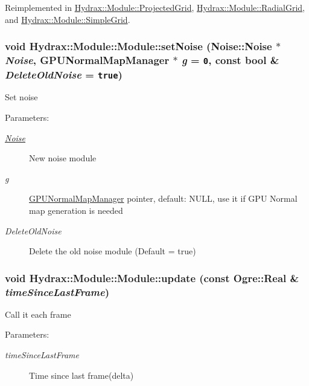 Reimplemented in \hyperlink{class_hydrax_1_1_module_1_1_projected_grid_4502387739439e0d6cca1f006fc4a28c}{Hydrax::Module::ProjectedGrid}, \hyperlink{class_hydrax_1_1_module_1_1_radial_grid_241237552e8f36f7e4696b8bad7acc91}{Hydrax::Module::RadialGrid}, and \hyperlink{class_hydrax_1_1_module_1_1_simple_grid_f79cb3a457da1fe8b015d9d7b5a6a376}{Hydrax::Module::SimpleGrid}.\hypertarget{class_hydrax_1_1_module_1_1_module_f591ded25b7cbba848ec2853402fa91e}{
\subsubsection[{setNoise}]{\setlength{\rightskip}{0pt plus 5cm}void Hydrax::Module::Module::setNoise ({\bf Noise::Noise} $\ast$ {\em Noise}, \/  {\bf GPUNormalMapManager} $\ast$ {\em g} = {\tt 0}, \/  const bool \& {\em DeleteOldNoise} = {\tt true})}}
\label{class_hydrax_1_1_module_1_1_module_f591ded25b7cbba848ec2853402fa91e}


Set noise \begin{Desc}
\item[Parameters:]
\begin{description}
\item[{\em \hyperlink{namespace_hydrax_1_1_noise}{Noise}}]New noise module \item[{\em g}]\hyperlink{class_hydrax_1_1_g_p_u_normal_map_manager}{GPUNormalMapManager} pointer, default: NULL, use it if GPU Normal map generation is needed \item[{\em DeleteOldNoise}]Delete the old noise module (Default = true) \end{description}
\end{Desc}
\hypertarget{class_hydrax_1_1_module_1_1_module_2042d450f99d9348fa4b7bd29ba89df3}{
\subsubsection[{update}]{\setlength{\rightskip}{0pt plus 5cm}void Hydrax::Module::Module::update (const Ogre::Real \& {\em timeSinceLastFrame})}}
\label{class_hydrax_1_1_module_1_1_module_2042d450f99d9348fa4b7bd29ba89df3}


Call it each frame \begin{Desc}
\item[Parameters:]
\begin{description}
\item[{\em timeSinceLastFrame}]Time since last frame(delta) \end{description}
\end{Desc}


